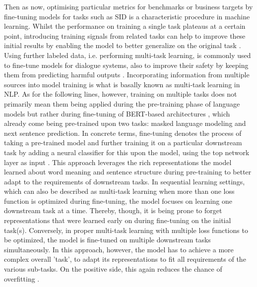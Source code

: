 \documentclass[11pt,a4paper,twoside,openright]{scrbook}
\begin{document}
Then as now, optimising particular metrics for benchmarks or business targets by fine-tuning models for tasks such as SID is a characteristic procedure in machine learning. Whilst the performance on training a single task plateaus at a certain point, introducing training signals from related tasks can help to improve these initial results by enabling the model to better generalize on the original task \citep{ruder2017overviewmultitasklearningdeep}. Using further labeled data, i.e. performing multi-task learning, is commonly used to fine-tune models for dialogue systems, also to improve their safety by keeping them from predicting harmful outputs \citep{jurafsky_martin_processing}. Incorporating information from multiple sources into model training is what is basally known as multi-task learning in NLP. As for the following lines, however, training on multiple tasks does not primarily mean them being applied during the pre-training phase of language models but rather during fine-tuning of BERT-based architectures \citep{devlin-etal-2019-bert}, which already come being pre-trained upon two tasks: masked language modeling and next sentence prediction. In concrete terms, fine-tuning denotes the process of taking a pre-trained model and further training it on a particular downstream task by adding a neural classifier for this upon the model, using the top network layer as input \citep{jurafsky_martin_processing}. This approach leverages the rich representations the model learned about word meaning and sentence structure during pre-training to better adapt to the requirements of downstream tasks. In sequential learning settings, which can also be described as multi-task learning when more than one loss function is optimized during fine-tuning, the model focuses on learning one downstream task at a time. Thereby, though, it is being prone to forget representations that were learned early on during fine-tuning on the initial task(s). Conversely, in proper multi-task learning with multiple loss functions to be optimized, the model is fine-tuned on multiple downstream tasks simultaneously. In this approach, however, the model has to achieve a more complex overall 'task', to adapt its representations to fit all requirements of the various sub-tasks. On the positive side, this again reduces the chance of overfitting \citep{ruder2017overviewmultitasklearningdeep}. 
\end{document}
